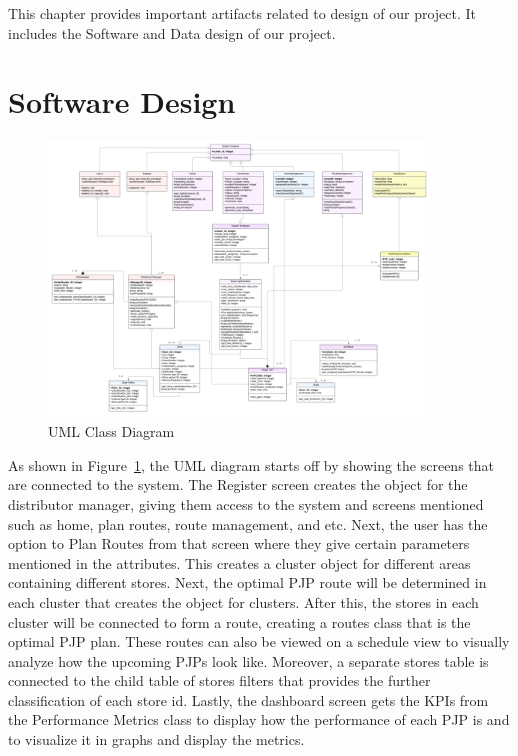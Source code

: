 
This chapter provides important artifacts related to design of our project. It includes the Software and Data design of our project.

\section{Software Design}


\begin{figure}[H]
    \centering
    \includegraphics[width=0.9\textwidth]{images/UML class f2.png} %
    \caption{UML Class Diagram}
    \label{fig:UML-image}
\end{figure}


As shown in Figure~\ref{fig:UML-image}, the UML diagram starts off by showing the screens that are connected to the system. The Register screen creates the object for the distributor manager, giving them access to the system and screens mentioned such as home, plan routes, route management, and etc. Next, the user has the option to Plan Routes from that screen where they give certain parameters mentioned in the attributes. This creates a cluster object for different areas containing different stores. Next, the optimal PJP route will be determined in each cluster that creates the object for clusters. After this, the stores in each cluster will be connected to form a route, creating a routes class that is the optimal PJP plan. These routes can also be viewed on a schedule view to visually analyze how the upcoming PJPs look like. Moreover, a separate stores table is connected to the child table of stores filters that provides the further classification of each store id. Lastly, the dashboard screen gets the KPIs from the Performance Metrics class to display how the performance of each PJP is and to visualize it in graphs and display the metrics.

